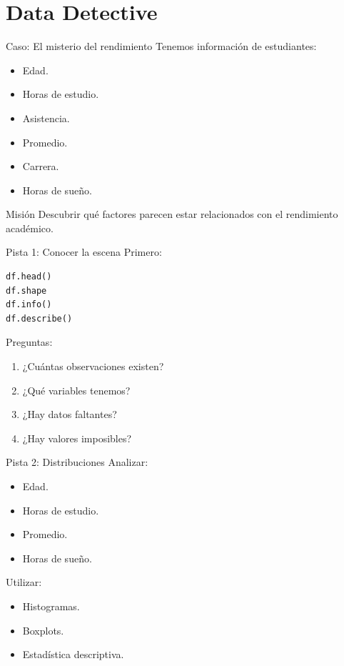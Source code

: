 \documentclass[aspectratio=169,11pt]{beamer}
\begin{document}
\section{Data Detective}
\begin{frame}{Caso: El misterio del rendimiento}
Tenemos información de estudiantes:
\begin{itemize}
    \item Edad.
    \item Horas de estudio.
    \item Asistencia.
    \item Promedio.
    \item Carrera.
    \item Horas de sueño.
\end{itemize}
\begin{block}{Misión}
Descubrir qué factores parecen estar relacionados con el rendimiento académico.
\end{block}
\end{frame}
\begin{frame}[fragile]{Pista 1: Conocer la escena}
Primero:
\begin{lstlisting}
df.head()
df.shape
df.info()
df.describe()
\end{lstlisting}
Preguntas:
\begin{enumerate}
    \item ¿Cuántas observaciones existen?
    \item ¿Qué variables tenemos?
    \item ¿Hay datos faltantes?
    \item ¿Hay valores imposibles?
\end{enumerate}
\end{frame}
\begin{frame}{Pista 2: Distribuciones}
Analizar:
\begin{itemize}
    \item Edad.
    \item Horas de estudio.
    \item Promedio.
    \item Horas de sueño.
\end{itemize}
Utilizar:
\begin{itemize}
    \item Histogramas.
    \item Boxplots.
    \item Estadística descriptiva.
\end{itemize}
\end{frame}
\end{document}
